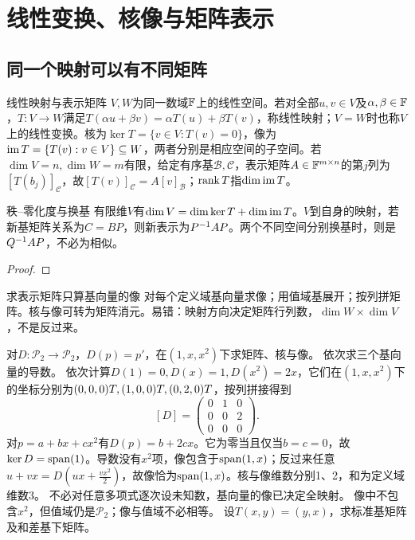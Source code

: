\section{线性变换、核像与矩阵表示}
\subsection{同一个映射可以有不同矩阵}
\begin{definition}{线性映射与表示矩阵}
$V,W$为同一数域$\mathbb{F}$上的线性空间。若对全部$u,v\in V$及$\alpha,\beta\in\mathbb{F}$，$T:V\to W$满足$T(\alpha u+\beta v)=\alpha T(u)+\beta T(v)$，称线性映射；$V=W$时也称$V$上的线性变换。核为$\ker T=\{v\in V:T(v)=0\}$，像为$\operatorname{im} T=\{T(v):v\in V\}\subseteq W$，两者分别是相应空间的子空间。若$\dim V=n,\dim W=m$有限，给定有序基$\mathcal B,\mathcal C$，表示矩阵$A\in\mathbb{F}^{m\times n}$的第$j$列为$[T(b_j)]_{\mathcal C}$，故$[T(v)]_{\mathcal C}=A[v]_{\mathcal B}$；$\operatorname{rank} T$指$\dim\operatorname{im} T$。
\end{definition}
\begin{theorem}{秩--零化度与换基}
有限维$V$有$\dim V=\dim\ker T+\dim\operatorname{im} T$。$V$到自身的映射，若新基矩阵关系为$C=BP$，则新表示为$P^{-1} AP$。两个不同空间分别换基时，则是$Q^{-1} AP$，不必为相似。
\end{theorem}
\begin{proof}

\end{proof}
\begin{method}{求表示矩阵只算基向量的像}
对每个定义域基向量求像；用值域基展开；按列拼矩阵。核与像可转为矩阵消元。易错：映射方向决定矩阵行列数，$\dim W\times\dim V$，不是反过来。
\end{method}
{对$D:\mathcal P_2\to\mathcal P_2$，$D(p)=p'$，在$(1,x,x^2)$下求矩阵、核与像。}
{依次求三个基向量的导数。}
{依次计算$D(1)=0,D(x)=1,D(x^2)=2x$，它们在$(1,x,x^2)$下的坐标分别为$(0,0,0)T,(1,0,0)T,(0,2,0)T$，按列拼接得到
\[[D]=\begin{pmatrix}0&1&0\\0&0&2\\0&0&0\end{pmatrix}.\]
对$p=a+bx+cx^2$有$D(p)=b+2cx$。它为零当且仅当$b=c=0$，故$\ker D=\operatorname{span}(1)$。导数没有$x^2$项，像包含于$\operatorname{span}(1,x)$；反过来任意$u+vx=D(ux+\frac{vx^2}{2})$，故像恰为$\operatorname{span}(1,x)$。核与像维数分别1、2，和为定义域维数3。}
{不必对任意多项式逐次设未知数，基向量的像已决定全映射。}
{像中不包含$x^2$，但值域仍是$\mathcal P_2$；像与值域不必相等。}
{设$T(x,y)=(y,x)$，求标准基矩阵及和差基下矩阵。}
